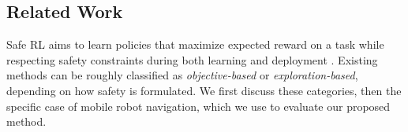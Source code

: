 





\subsection{Related Work} \label{sec:related}
Safe RL aims to learn policies that maximize expected reward on a task while respecting safety constraints during both learning and deployment \cite{garcia2015comprehensive}. 
Existing methods can be roughly classified as \emph{objective-based} or \emph{exploration-based}, depending on how safety is formulated.
We first discuss these categories, then the specific case of mobile robot navigation, which we use to evaluate our proposed method.


